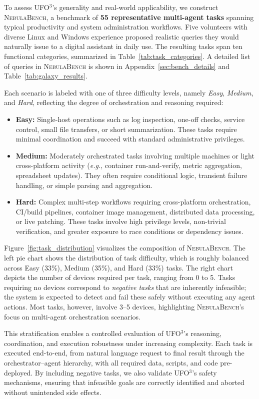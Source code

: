 \documentclass[10pt]{article} %
\newcommand{\ufo}{\textsc{UFO}$^3$\xspace}
\newcommand{\bench}{\textsc{NebulaBench}\xspace}
\newcommand{\eg}{\textit{e.g.},\xspace}
\begin{document}
To assess \ufo's generality and real-world applicability, we construct \bench, a benchmark of \textbf{55 representative multi-agent tasks} spanning typical productivity and system administration workflows. Five volunteers with diverse Linux and Windows experience proposed realistic queries they would naturally issue to a digital assistant in daily use. The resulting tasks span ten functional categories, summarized in Table~\ref{tab:task_categories}. A detailed list of queries in \bench is shown in Appendix~\ref{sec:bench_details} and Table~\ref{tab:galaxy_results}.

Each scenario is labeled with one of three difficulty levels, namely \textit{Easy}, \textit{Medium}, and \textit{Hard}, reflecting the degree of orchestration and reasoning required:
\begin{itemize}
    \item \textbf{Easy:} Single-host operations such as log inspection, one-off checks, service control, small file transfers, or short summarization. These tasks require minimal coordination and succeed with standard administrative privileges.
    \item \textbf{Medium:} Moderately orchestrated tasks involving multiple machines or light cross-platform activity (\eg container run-and-verify, metric aggregation, spreadsheet updates). They often require conditional logic, transient failure handling, or simple parsing and aggregation.
    \item \textbf{Hard:} Complex multi-step workflows requiring cross-platform orchestration, CI/build pipelines, container image management, distributed data processing, or live patching. These tasks involve high privilege levels, non-trivial verification, and greater exposure to race conditions or dependency issues.
\end{itemize}
Figure~\ref{fig:task_distribution} visualizes the composition of \bench. The left pie chart shows the distribution of task difficulty, which is roughly balanced across Easy (33\%), Medium (35\%), and Hard (33\%) tasks. The right chart depicts the number of devices required per task, ranging from 0 to 5. Tasks requiring no devices correspond to \textit{negative tasks} that are inherently infeasible; the system is expected to detect and fail these safely without executing any agent actions. Most tasks, however, involve 3–5 devices, highlighting \bench's focus on multi-agent orchestration scenarios.

This stratification enables a controlled evaluation of \ufo's reasoning, coordination, and execution robustness under increasing complexity. Each task is executed end-to-end, from natural language request to final result through the orchestrator–agent hierarchy, with all required data, scripts, and code pre-deployed. By including negative tasks, we also validate \ufo's safety mechanisms, ensuring that infeasible goals are correctly identified and aborted without unintended side effects.
\end{document}
